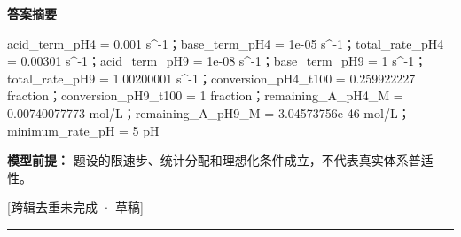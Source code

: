 \documentclass[UTF8,11pt,a4paper]{ctexart}
\begin{document}
\noindent\textbf{答案摘要}\par
acid\_term\_pH4 = 0.001 s\textasciicircum{}-1；base\_term\_pH4 = 1e-05 s\textasciicircum{}-1；total\_rate\_pH4 = 0.00301 s\textasciicircum{}-1；acid\_term\_pH9 = 1e-08 s\textasciicircum{}-1；base\_term\_pH9 = 1 s\textasciicircum{}-1；total\_rate\_pH9 = 1.00200001 s\textasciicircum{}-1；conversion\_pH4\_t100 = 0.259922227 fraction；conversion\_pH9\_t100 = 1 fraction；remaining\_A\_pH4\_M = 0.00740077773 mol/L；remaining\_A\_pH9\_M = 3.04573756e-46 mol/L；minimum\_rate\_pH = 5 pH\par
\noindent\textbf{模型前提：}
题设的限速步、统计分配和理想化条件成立，不代表真实体系普适性。\par
\noindent\textcolor{red!65!black}{[跨辑去重未完成 · 草稿]} \par
\medskip\hrule\medskip
{}
\end{document}
